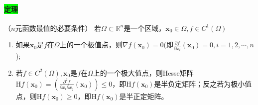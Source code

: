 \documentclass[UTF8]{ctexart}
\newcommand{\p}[2]{\frac{\partial #1}{\partial #2}}
\begin{document}
    \paragraph{\colorbox{lime}{定理}}（$n$元函数最值的必要条件）  若$\Omega\subset\mathbb{R}^n$是一个区域，$\boldsymbol{x}_0\in\Omega,f\in C^1(\Omega)$
    \begin{enumerate}[(1)]
        \item 如果$\boldsymbol{x}_0$是$f$在$\Omega$上的一个极值点，则$\nabla f(\boldsymbol{x}_0)=0$(即$\p{f}{x_i}(\boldsymbol{x}_0)=0,i=1,2,\cdots,n$);
        \item 若$f\in C^2(\Omega),\boldsymbol{x}_0$是$f$在$\Omega$上的一个极大值点，则Hesse矩阵$\mathrm{H}f(\boldsymbol{x}_0)=\left(\frac{\partial^2f}{\partial x_i\partial x_j}(\boldsymbol{x}_0)\right)\le 0$，即$\mathrm{H}f(\boldsymbol{x}_0)$是半负定矩阵；反之若为极小值点，则$\mathrm{H}f(\boldsymbol{x}_0)\ge 0$，即$\mathrm{H}f(\boldsymbol{x}_0)$是半正定矩阵。
    \end{enumerate}
\end{document}
